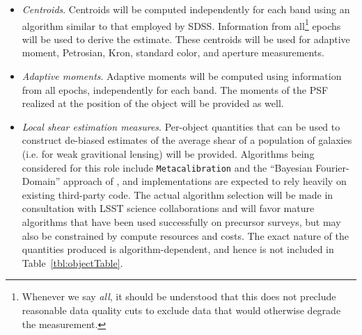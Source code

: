 \begin{itemize}
    \item \emph{Centroids}. Centroids will be computed independently for each band using an algorithm similar to that employed by SDSS. Information from all\footnote{Whenever we say \emph{all}, it should be understood that this does not preclude reasonable data quality cuts to exclude data that would otherwise degrade the measurement.} epochs will be used to derive the estimate. These centroids will be used for adaptive moment, Petrosian, Kron, standard color, and aperture measurements. 

    \item \emph{Adaptive moments}. Adaptive moments will be computed using information from all epochs, independently for each band. The moments of the PSF realized at the position of the object will be provided as well. 

    \item \emph{Local shear estimation measures}. Per-object quantities that can be used to construct de-biased estimates of the average shear of a population of galaxies (i.e. for weak gravitional lensing) will be provided.  Algorithms being considered for this role include \texttt{Metacalibration} \citep{2017arXiv170202600H,2017ApJ...841...24S} and the ``Bayesian Fourier-Domain'' approach of \citet{2016MNRAS.459.4467B}, and implementations are expected to rely heavily on existing third-party code.  The actual algorithm selection will be made in consultation with LSST science collaborations and will favor mature algorithms that have been used successfully on precursor surveys, but may also be constrained by compute resources and costs.  The exact nature of the quantities produced is algorithm-dependent, and hence is not included in Table~\ref{tbl:objectTable}.


\end{itemize}
